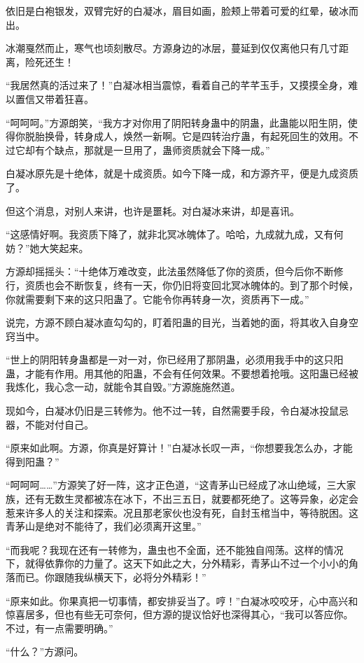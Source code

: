 \begin{this_body}
依旧是白袍银发，双臂完好的白凝冰，眉目如画，脸颊上带着可爱的红晕，破冰而出。

冰潮戛然而止，寒气也顷刻散尽。方源身边的冰层，蔓延到仅仅离他只有几寸距离，险死还生！

“我居然真的活过来了！”白凝冰相当震惊，看着自己的芊芊玉手，又摸摸全身，难以置信又带着狂喜。

“呵呵呵。”方源朗笑，“我方才对你用了阴阳转身蛊中的阴蛊，此蛊能以阳生阴，使得你脱胎换骨，转身成人，焕然一新啊。它是四转治疗蛊，有起死回生的效用。不过它却有个缺点，那就是一旦用了，蛊师资质就会下降一成。”

白凝冰原先是十绝体，就是十成资质。如今下降一成，和方源齐平，便是九成资质了。

但这个消息，对别人来讲，也许是噩耗。对白凝冰来讲，却是喜讯。

“这感情好啊。我资质下降了，就非北冥冰魄体了。哈哈，九成就九成，又有何妨？”她大笑起来。

方源却摇摇头：“十绝体万难改变，此法虽然降低了你的资质，但今后你不断修行，资质也会不断恢复，终有一天，你仍旧将变回北冥冰魄体的。到了那个时候，你就需要剩下来的这只阳蛊了。它能令你再转身一次，资质再下一成。”

说完，方源不顾白凝冰直勾勾的，盯着阳蛊的目光，当着她的面，将其收入自身空窍当中。

“世上的阴阳转身蛊都是一对一对，你已经用了那阴蛊，必须用我手中的这只阳蛊，才能有作用。用其他的阳蛊，不会有任何效果。不要想着抢哦。这阳蛊已经被我炼化，我心念一动，就能令其自毁。”方源施施然道。

现如今，白凝冰仍旧是三转修为。他不过一转，自然需要手段，令白凝冰投鼠忌器，不能对付自己。

“原来如此啊。方源，你真是好算计！”白凝冰长叹一声，“你想要我怎么办，才能得到阳蛊？”

“呵呵呵……”方源笑了好一阵，这才正色道，“这青茅山已经成了冰山绝域，三大家族，还有无数生灵都被冻在冰下，不出三五日，就要都死绝了。这等异象，必定会惹来许多人的关注和探索。况且那老家伙也没有死，自封玉棺当中，等待脱困。这青茅山是绝对不能待了，我们必须离开这里。”

“而我呢？我现在还有一转修为，蛊虫也不全面，还不能独自闯荡。这样的情况下，就得依靠你的力量了。这天下如此之大，分外精彩，青茅山不过一个小小的角落而已。你跟随我纵横天下，必将分外精彩！”

“原来如此。你果真把一切事情，都安排妥当了。哼！”白凝冰咬咬牙，心中高兴和惊喜居多，但也有些无可奈何，但方源的提议恰好也深得其心，“我可以答应你。不过，有一点需要明确。”

“什么？”方源问。


\end{this_body}
